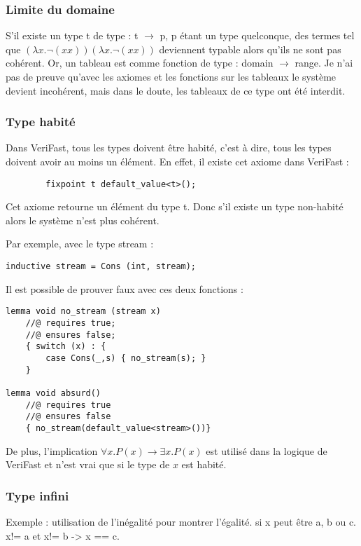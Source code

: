 \documentclass[9pt]{book}
\newcommand{\verifast}{VeriFast}
\begin{document}
			\subsubsection{Limite du domaine}
			S'il existe un type t de type : t $\rightarrow$ p, p \'etant un type quelconque, des termes tel que $(\lambda x. \neg(xx))(\lambda x.\neg(xx))$ 	deviennent typable alors qu'ils ne sont pas coh\'erent. Or, un tableau est comme fonction de type : domain $\rightarrow$ range. Je n'ai pas de preuve qu'avec les axiomes et les fonctions sur les tableaux le syst\`eme devient incoh\'erent, mais dans le doute, les tableaux de ce type ont \'et\'e interdit.
			\subsubsection{Type habit\'e}
				Dans \verifast{}, tous les types doivent \^etre habit\'e, c'est \`a dire, tous les types doivent avoir au moins un \'el\'ement. En effet, il existe cet axiome dans \verifast{} :
		\begin{lstlisting}
		fixpoint t default_value<t>();
		\end{lstlisting}
		Cet axiome retourne un \'el\'ement du type t. Donc s'il existe un type non-habit\'e alors le syst\`eme n'est plus coh\'erent. \par
		Par exemple, avec le type stream :
\begin{lstlisting}
inductive stream = Cons (int, stream);
\end{lstlisting}
Il est possible de prouver faux avec ces deux fonctions :
\begin{lstlisting}
lemma void no_stream (stream x)
	//@ requires true;
	//@ ensures false;
	{ switch (x) : {
		case Cons(_,s) { no_stream(s); }
	}

lemma void absurd()
	//@ requires true
	//@ ensures false
	{ no_stream(default_value<stream>())}

		\end{lstlisting}
\par De plus, l'implication
				$\forall x. P(x) \rightarrow \exists x. P(x)$ est utilis\'e dans la logique de \verifast{} et n'est vrai que si le type de $x$ est habit\'e.
			\subsubsection{Type infini}
				Exemple : utilisation de l'in\'egalit\'e pour montrer l'\'egalit\'e. si x peut \^etre a, b ou c. x!= a et x!= b -> x == c.
\end{document}
